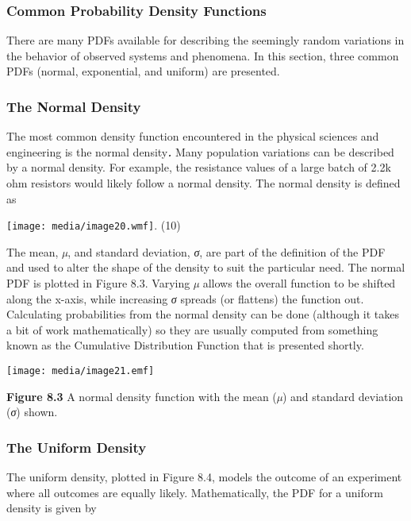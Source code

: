 \subsubsection{Common Probability Density
Functions}\label{common-probability-density-functions}

There are many PDFs available for describing the seemingly random
variations in the behavior of observed systems and phenomena. In this
section, three common PDFs (normal, exponential, and uniform) are
presented.

\subsubsection*{The Normal Density}\label{the-normal-density}

The most common density function encountered in the physical sciences
and engineering is the normal density\emph{\textbf{.}} Many population
variations can be described by a normal density. For example, the
resistance values of a large batch of 2.2k ohm resistors would likely
follow a normal density. The normal density is defined as

\texttt{[image: media/image20.wmf]}. (10)

The mean, \emph{µ}, and standard deviation, \emph{σ}, are part of the
definition of the PDF and used to alter the shape of the density to suit
the particular need. The normal PDF is plotted in Figure 8.3. Varying
\emph{µ} allows the overall function to be shifted along the x-axis,
while increasing \emph{σ} spreads (or flattens) the function out.
Calculating probabilities from the normal density can be done (although
it takes a bit of work mathematically) so they are usually computed from
something known as the Cumulative Distribution Function that is
presented shortly.

\texttt{[image: media/image21.emf]}

\textbf{Figure 8.3} A normal density function with the mean (\emph{µ})
and standard deviation (\emph{σ}) shown.

\subsubsection*{The Uniform Density}\label{the-uniform-density}

The uniform density, plotted in Figure 8.4, models the outcome of an
experiment where all outcomes are equally likely. Mathematically, the
PDF for a uniform density is given by


